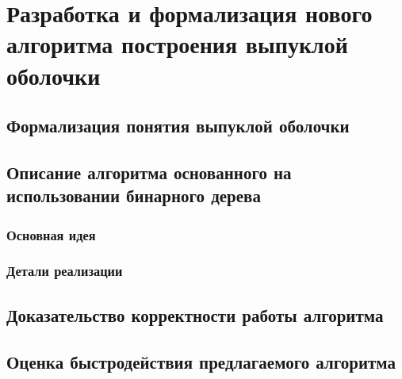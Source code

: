 \chapter{Разработка и формализация нового алгоритма построения выпуклой оболочки} \label{chapt2}

\section{Формализация понятия выпуклой оболочки} \label{sect2_1}

\section{Описание алгоритма основанного на использовании бинарного дерева} \label{sect2_2}

\subsection{Основная идея} \label{subsect2_2_1}

\subsection{Детали реализации} \label{subsect2_2_2}

\section{Доказательство корректности работы алгоритма} \label{subsect2_3}

\section{Оценка быстродействия предлагаемого алгоритма} \label{subsect2_4}


